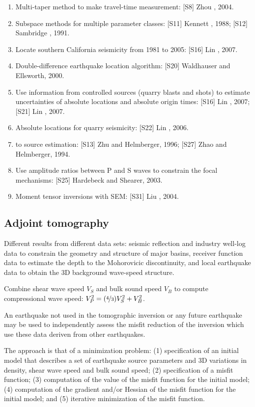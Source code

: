 \begin{enumerate}[\hspace{10mm}*]
  \item Multi-taper method to make travel-time measurement: [S8] Zhou \etal, 2004.
  \item Subspace methods for multiple parameter classes:
    [S11] Kennett \etal, 1988; [S12] Sambridge \etal, 1991.
  \item Locate southern California seismicity from 1981 to 2005: [S16] Lin \etal, 2007.
  \item Double-difference earthquake location algorithm: [S20] Waldhauser and Ellsworth, 2000.
  \item Use information from controlled sources (quarry blasts and shots)
    to estimate uncertainties of absolute locations and absolute origin times:
    [S16] Lin \etal, 2007; [S21] Lin \etal, 2007.
  \item Absolute locations for quarry seismicity: [S22] Lin \etal, 2006.
  \item {}
    to source estimation: [S13] Zhu and Helmberger, 1996; [S27] Zhao and Helmberger, 1994.
  \item Use amplitude ratios between P and S waves to constrain the focal mechanisms:
    [S25] Hardebeck and Shearer, 2003.
  \item Moment tensor inversions with SEM: [S31] Liu \etal, 2004.
\end{enumerate}

\subsection{Adjoint tomography}
Different results from different data sets:
seismic reflection and industry well-log data
to constrain the geometry and structure of major basins,
receiver function data to estimate the depth to the Mohorovicic discontinuity,
and local earthquake data to obtain the 3D background wave-speed structure.

Combine shear wave speed $V_S$ and bulk sound speed $V_B$
to compute compressional wave speed: $V_P^2=(\nicefrac{4}{3})V_S^2+V_B^2$.

An earthquake not used in the tomographic inversion or any future earthquake
may be used to independently assess the misfit reduction of the inversion
which use these data deriven from other earthquakes.

The approach is that of a minimization problem:
(1) specification of an initial model that describes a set of earthquake source parameters
and 3D variations in density, shear wave speed and bulk sound speed;
(2) specification of a misfit function;
(3) computation of the value of the misfit function for the initial model;
(4) computation of the gradient and/or Hessian of the misfit function for the initial model;
and (5) iterative minimization of the misfit function.

